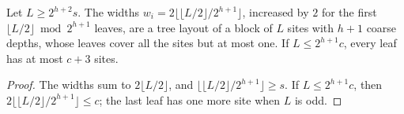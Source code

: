 \begin{lemma}
    \label{lem:ldp_balanced_widths}
    \leanok
    Let $L\ge2^{h+2}s$. The widths $w_i=2\lfloor\lfloor L/2\rfloor/2^{h+1}\rfloor$,
    increased by $2$ for the first $\lfloor L/2\rfloor\bmod2^{h+1}$ leaves, are a
    tree layout of a block of $L$ sites with $h+1$ coarse depths, whose leaves
    cover all the sites but at most one. If $L\le2^{h+1}c$, every leaf has at most
    $c+3$ sites.
\end{lemma}
\begin{proof}
    \leanok
    The widths sum to $2\lfloor L/2\rfloor$, and
    $\lfloor\lfloor L/2\rfloor/2^{h+1}\rfloor\ge s$. If $L\le2^{h+1}c$, then
    $2\lfloor\lfloor L/2\rfloor/2^{h+1}\rfloor\le c$; the last leaf has one more
    site when $L$ is odd.
\end{proof}

